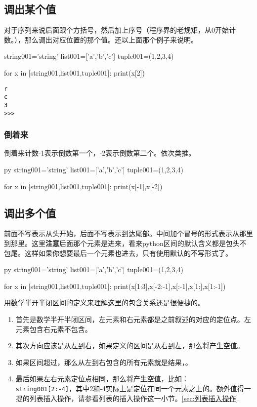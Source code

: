 \documentclass[12pt,oneside]{book}
\begin{document}
\begin{common-format}
\subsection{调出某个值}
对于序列来说后面跟个方括号，然后加上序号（程序界的老规矩，从0开始计数。），那么调出对应位置的那个值。还以上面那个例子来说明。
\begin{tcbpython}[]
string001='string'
list001=['a','b','c']
tuple001=(1,2,3,4)

for x in [string001,list001,tuple001]:
    print(x[2])
\end{tcbpython}
\begin{Verbatim}
r
c
3
>>> 
\end{Verbatim}


\subsubsection{倒着来}
倒着来计数-1表示倒数第一个，-2表示倒数第二个。依次类推。
\begin{xverbatim}[129]{py}
string001='string'
list001=['a','b','c']
tuple001=(1,2,3,4)

for x in [string001,list001,tuple001]:
    print(x[-1],x[-2])
\end{xverbatim}

\subsection{调出多个值}
\label{sec:调出多个值}
前面不写表示从头开始，后面不写表示到达尾部。中间加个冒号的形式表示从那里到那里。这里\textbf{注意}后面那个元素是进来，看来python区间的默认含义都是包头不包尾。这样如果你想要最后一个元素也进去，只有使用默认的不写形式了。
\begin{xverbatim}[129]{py}
string001='string'
list001=['a','b','c']
tuple001=(1,2,3,4)

for x in [string001,list001,tuple001]:
    print(x[1:3],x[-2:-1],x[:-1],x[1:],x[1:-1])
\end{xverbatim}
用数学半开半闭区间的定义来理解这里的包含关系还是很便捷的。
\begin{enumerate}
\item 首先是数学半开半闭区间，左元素和右元素都是之前叙述的对应的定位点。左元素包含右元素不包含。
\item 其次方向应该是从左到右，如果定义的区间是从右到左，那么将产生空值。
\item 如果区间超过，那么从左到右包含的所有元素就是结果，。
\item 最后如果左右元素定位点相同，那么将产生空值，比如：\\
\verb+string001[2:-4]+，其中2和-4实际上是定位在同一个元素之上的。额外值得一提的列表插入操作，请参看列表的插入操作这一小节。\ref{sec:列表插入操作}
\end{enumerate}



\end{common-format}
\end{document}
